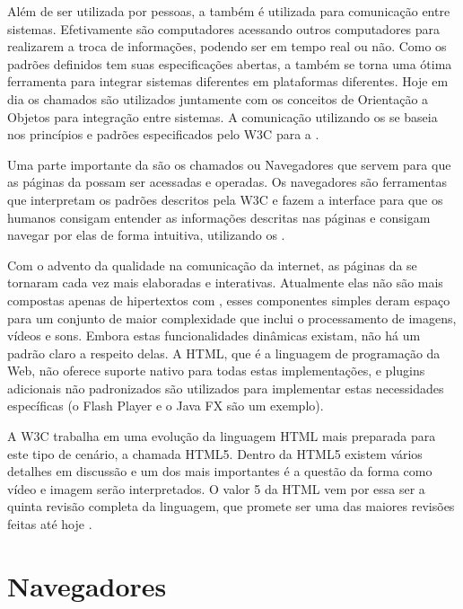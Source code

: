 \documentclass[espaco=simples,appendix=Name]{abnt}
\begin{document}
Além de ser utilizada por pessoas, a  também é utilizada para comunicação entre sistemas. Efetivamente são computadores acessando outros computadores para realizarem a troca de informações, podendo ser em tempo real ou não. Como os padrões definidos tem suas especificações abertas, a  também se torna uma ótima ferramenta para integrar sistemas diferentes em plataformas diferentes. Hoje em dia os chamados  são utilizados juntamente com os conceitos de Orientação a Objetos para integração entre sistemas. A comunicação utilizando os  se baseia nos princípios e padrões especificados pelo W3C para a  \cite{WebServices}.

Uma parte importante da  são os chamados  ou Navegadores que servem para que as páginas da  possam ser acessadas e operadas. Os navegadores são ferramentas que interpretam os padrões descritos pela W3C e fazem a interface para que os humanos consigam entender as informações descritas nas páginas e consigam navegar por elas de forma intuitiva, utilizando os .

Com o advento da qualidade na comunicação da internet, as páginas da  se tornaram cada vez mais elaboradas e interativas. Atualmente elas não são mais compostas apenas de hipertextos com , esses componentes simples deram espaço para um conjunto de maior complexidade que inclui o processamento de imagens, vídeos e sons. Embora estas funcionalidades dinâmicas existam, não há um padrão claro a respeito delas. A HTML, que é a linguagem de programação da Web, não oferece suporte nativo para todas estas implementações, e plugins adicionais não padronizados são utilizados para implementar estas necessidades específicas (o Flash Player e o Java FX são um exemplo).

A W3C trabalha em uma evolução da linguagem HTML mais preparada para este tipo de cenário, a chamada HTML5. Dentro da HTML5 existem vários detalhes em discussão e um dos mais importantes é a questão da forma como vídeo e imagem serão interpretados. O valor 5 da HTML vem por essa ser a quinta revisão completa da linguagem, que promete ser uma das maiores revisões feitas até hoje \cite{HTML5spec}.


\section{Navegadores}
\end{document}
